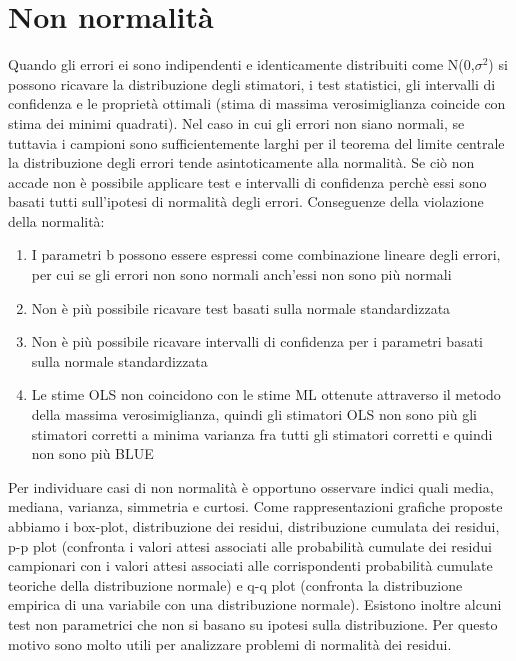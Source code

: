 \documentclass[a4page, 11pt]{article}
\begin{document}
\section{Non normalità}

Quando gli errori ei sono indipendenti e identicamente distribuiti come N(0,$\sigma^{2}$) si possono ricavare la distribuzione degli stimatori, i test statistici, gli intervalli di confidenza e le proprietà ottimali (stima di massima verosimiglianza coincide con stima dei minimi quadrati). Nel caso in cui gli errori non siano normali, se tuttavia i campioni sono sufficientemente larghi per il teorema del limite centrale la distribuzione degli errori tende asintoticamente alla normalità. Se ciò non accade non è possibile applicare test e intervalli di confidenza perchè essi sono basati tutti sull’ipotesi di normalità degli errori.
\newline
\newline
Conseguenze della violazione della normalità:
\begin{enumerate}[noitemsep]
\item I parametri b possono essere espressi come combinazione lineare degli errori, per cui se gli errori non sono normali anch’essi non sono più normali
\item Non è più possibile ricavare test basati sulla normale standardizzata
\item Non è più possibile ricavare intervalli di confidenza per i parametri basati sulla normale standardizzata
\item Le stime OLS non coincidono con le stime ML ottenute attraverso il metodo della massima verosimiglianza, quindi gli stimatori OLS non sono più gli stimatori corretti a minima varianza fra tutti gli stimatori corretti e quindi non sono più BLUE
\end{enumerate}
Per individuare casi di non normalità è opportuno osservare indici quali media, mediana, varianza, simmetria e curtosi. Come rappresentazioni grafiche proposte abbiamo i box-plot, distribuzione dei residui, distribuzione cumulata dei residui, p-p plot (confronta i valori attesi associati alle probabilità cumulate dei residui campionari con i valori attesi associati alle corrispondenti probabilità cumulate teoriche della distribuzione normale) e q-q plot (confronta la distribuzione empirica di una variabile con una distribuzione normale). 
Esistono inoltre alcuni test non parametrici che non si basano su ipotesi sulla distribuzione. Per questo motivo sono molto utili per analizzare problemi di normalità dei residui.
\end{document}
